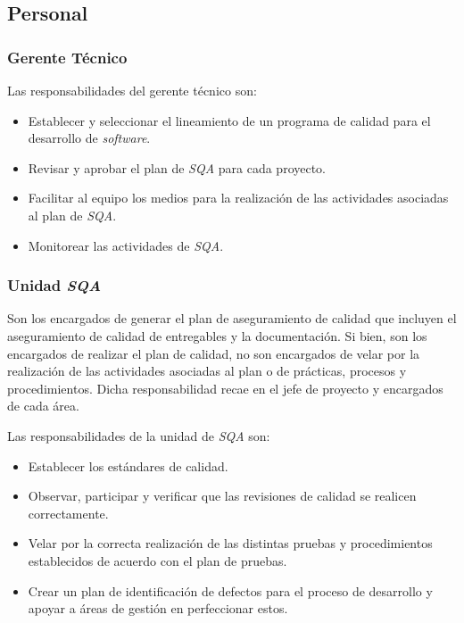 \subsection{Personal}
\subsubsection{Gerente Técnico}

Las responsabilidades del gerente técnico son:

	\begin{itemize}
		\item 
		 Establecer y seleccionar el lineamiento de un programa de calidad para el desarrollo de \textit{software}.
		\item
		 Revisar y aprobar el plan de \textit{SQA} para cada proyecto. 
		 \item
		 Facilitar al equipo los medios para la realización de las actividades asociadas al plan de \textit{SQA}.
		 \item 
		 Monitorear las actividades de \textit{SQA}.
	\end{itemize}

\subsubsection{Unidad \textit{SQA}}

Son los encargados de generar el plan de aseguramiento de calidad que incluyen el aseguramiento de calidad de entregables y la documentación. Si bien, son los encargados de realizar el plan de calidad, no son encargados de velar por la realización de las actividades asociadas al plan o de prácticas, procesos y procedimientos. Dicha responsabilidad recae en el jefe de proyecto y encargados de cada área.

Las responsabilidades de la unidad de \textit{SQA} son: 

	\begin{itemize}
		\item 
		 Establecer los estándares de calidad.
		\item
		 Observar, participar y verificar que las revisiones de calidad se realicen correctamente. 
		 \item
		Velar por la correcta realización de las distintas pruebas y procedimientos establecidos de acuerdo con el plan de pruebas.
		 \item 
		Crear un plan de identificación de defectos para el proceso de desarrollo y apoyar a áreas de gestión en perfeccionar estos.
	\end{itemize}


